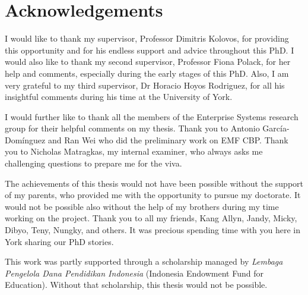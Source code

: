 \documentclass[11pt, a4paper]{report} \usepackage[titletoc]{appendix}
\begin{document}
  \cleardoublepage
  \listoffigures
  
  \cleardoublepage
  \listoftables
  
  \cleardoublepage
  \lstlistoflistings
  
  \cleardoublepage
  
  \cleardoublepage
  \chapter*{Acknowledgements}
  I would like to thank my supervisor, Professor Dimitris Kolovos, for providing this opportunity and for his endless support and advice throughout this PhD. I would also like to thank my second supervisor, Professor Fiona Polack, for her help and comments, especially during the early stages of this PhD. Also, I am very grateful to my third supervisor, Dr Horacio Hoyos Rodriguez, for all his insightful comments during his time at the University of York.
  
  I would further like to thank all the members of the Enterprise Systems research group for their helpful comments on my thesis. Thank you to Antonio García-Domínguez and Ran Wei who did the preliminary work on EMF CBP. Thank you to Nicholas Matragkas, my internal examiner, who always asks me challenging questions to prepare me for the viva.
  
  The achievements of this thesis would not have been possible without the support of my parents, who provided me with the opportunity to pursue my doctorate. It would not be possible also without the help of my brothers during my time working on the project. Thank you to all my friends, Kang Allyn, Jandy, Micky, Dibyo, Teny, Nungky, and others. It was precious spending time with you here in York sharing our PhD stories.
  
  This work was partly supported through a scholarship managed by \emph{Lembaga Pengelola Dana Pendidikan Indonesia} (Indonesia Endowment Fund for Education).
  Without that scholarship, this thesis would not be possible.
  
\end{document}
